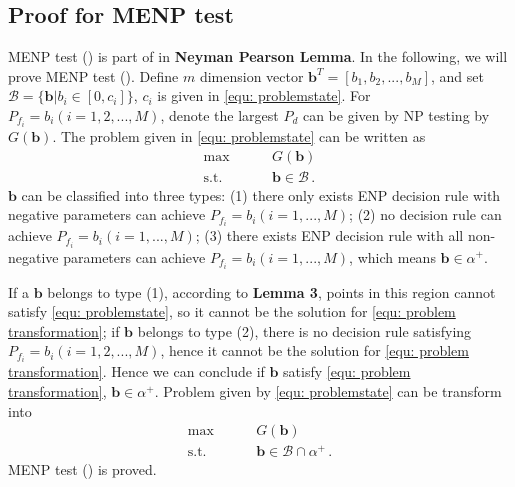 \documentclass[12pt,journal,a4paper,twoside,onecolumn]{IEEEtran}
\newcommand{\rmnum}[1]{\romannumeral #1}
\begin{document}
\begin{spacing}{2.5}
\subsection{Proof for MENP test}
MENP test (\rmnum{1}) is part of in \textbf{Neyman Pearson Lemma}. In the following, we will prove MENP test (\rmnum{2}). Define $m$ dimension vector $\mathbf{b}^T = [b_1, b_2, ..., b_M]$, and set $\mathcal{B} = \{ \mathbf{b} |  b_i \in [0, c_i] \}$, $c_i$
is given in \eqref{equ: problemstate}. For $P_{f_i} = b_i (i = 1, 2, ..., M)$, denote the largest $P_d$ can be given by NP testing by $G(\mathbf{b})$. The problem given in \eqref{equ: problemstate} can be written as
\begin{equation}
\label{equ: problem transformation}
\begin{split}
\max\;\;\;\;\;\;\;\;&G(\mathbf{b})\\
\text{s.t.}\;\;\;\;\;\;\;\;& \mathbf{b} \in \mathcal{B}\,.
\end{split}
\end{equation}
$\mathbf{b}$ can be classified into three types: (1) there only exists ENP decision rule with negative parameters can achieve $P_{f_i} = b_i (i = 1, ..., M)$; (2) no decision rule can achieve $P_{f_i} = b_i (i = 1, ..., M)$; (3) there exists ENP decision rule with all non-negative parameters can achieve $P_{f_i} = b_i (i = 1, ..., M)$, which means $\mathbf{b} \in \alpha^+$.

If a $\mathbf{b}$ belongs to type (1), according to \textbf{Lemma 3},  points in this region cannot satisfy \eqref{equ: problemstate}, so it cannot be the solution for  \eqref{equ: problem transformation}; if $\mathbf{b}$ belongs to type (2), there is no decision rule satisfying $P_{f_i} = b_i (i = 1, 2, ..., M)$, hence it cannot be the solution for \eqref{equ: problem transformation}. Hence we can conclude if $\mathbf{b}$ satisfy \eqref{equ: problem transformation}, $\mathbf{b} \in \alpha^+$.  Problem given by \eqref{equ: problemstate} can be transform into
\begin{equation}
\label{equ: problem transformation 2}
\begin{split}
\max\;\;\;\;\;\;\;\;&G(\mathbf{b})\\
\text{s.t.}\;\;\;\;\;\;\;\;& \mathbf{b} \in \mathcal{B} \cap \alpha^+ \,.
\end{split}
\end{equation}
MENP test (\rmnum{2}) is proved.


\end{spacing}
\end{document}
